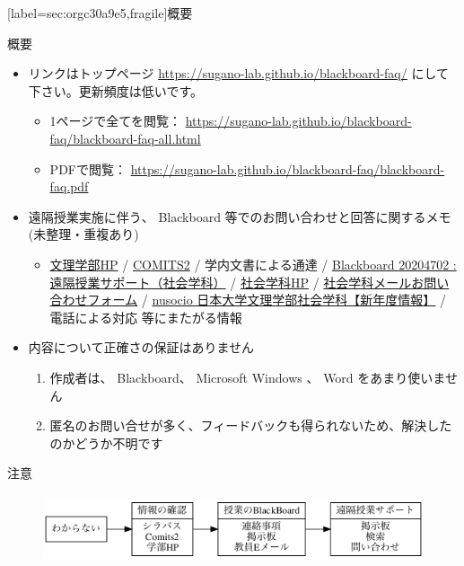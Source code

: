 \documentclass[a4j,10pt]{jsarticle}
\begin{document}
\setcounter{tocdepth}{2}
{\newpage\clearpage
{}%
\begin{frame}
[label={sec:orgc30a9e5},fragile]{概要}
\begin{block}{概要}
\begin{itemize}
\item リンクはトップページ \url{https://sugano-lab.github.io/blackboard-faq/} にして下さい。更新頻度は低いです。
\begin{itemize}
\item 1ページで全てを閲覧： \url{https://sugano-lab.github.io/blackboard-faq/blackboard-faq-all.html}
\item PDFで閲覧： \url{https://sugano-lab.github.io/blackboard-faq/blackboard-faq.pdf}
\end{itemize}
\item 遠隔授業実施に伴う、 Blackboard 等でのお問い合わせと回答に関するメモ (未整理・重複あり)
\begin{itemize}
\item \href{https://www.chs.nihon-u.ac.jp/}{文理学部HP} / \href{https://comits2.educ.chs.nihon-u.ac.jp/uniprove\_pt/UnLoginAction}{COMITS2} / 学内文書による通達 / \href{https://nuchs.blackboard.com/webapps/blackboard/execute/launcher?type=Course\&id=\_2302\_1\&url=}{Blackboard 20204702 : 遠隔授業サポート（社会学科）} / \href{http://dep.chs.nihon-u.ac.jp/sociology/index.htm}{社会学科HP} / \href{http://dep.chs.nihon-u.ac.jp/sociology/form.html}{社会学科メールお問い合わせフォーム} / \href{https://sites.google.com/a/nihon-u.ac.jp/nusocio/home}{nusocio 日本大学文理学部社会学科【新年度情報】} / 電話による対応 等にまたがる情報
\end{itemize}
\par
\item 内容について正確さの保証はありません
\begin{enumerate}
\item 作成者は、 Blackboard、 Microsoft Windows 、 Word をあまり使いません
\item 匿名のお問い合せが多く、フィードバックも得られないため、解決したのかどうか不明です
\end{enumerate}
\end{itemize}
\end{block}
\par
\begin{block}{注意}
\begin{figure}[htbp]
\centering
\includegraphics[height=2cm]{figures/blackboard-faq-dot-01.png}

\end{figure}
\end{block}
\end{frame}}
\end{document}
